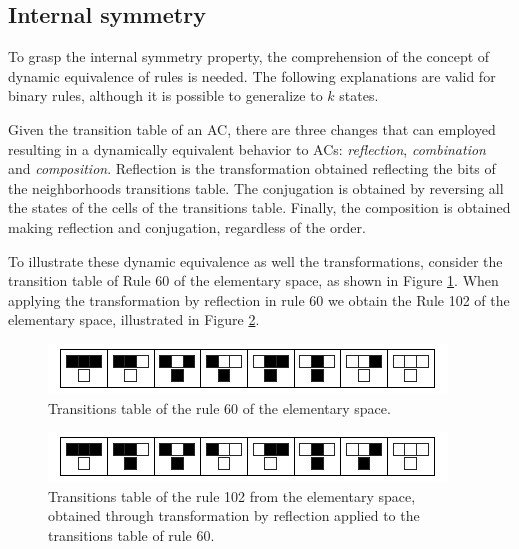 \documentclass{llncs}
\begin{document}
\subsection{Internal symmetry}
To grasp the internal symmetry property, the comprehension of the concept of dynamic equivalence of rules is needed. The following explanations are valid for binary rules, although it is possible to generalize to $k$ states.


Given the transition table of an AC, there are three changes that can employed resulting in a dynamically equivalent behavior to ACs: \textit{reflection}, \textit{combination} and \textit{composition}. Reflection is the transformation obtained reflecting the bits of the neighborhoods transitions table. The conjugation is obtained by reversing all the states of the cells of the transitions table. Finally, the composition is obtained making reflection and conjugation, regardless of the order.

To illustrate these dynamic equivalence as well the transformations, consider the transition table of Rule 60 of the elementary space, as shown in Figure \ref{fig:table60}. When applying the transformation by reflection in rule 60 we obtain the Rule 102 of the elementary space, illustrated in Figure \ref{fig:table102}.

  \begin{figure}[h!]
    \centering
    \includegraphics[width=.5\textwidth]{fig_ruleIcon60.png}
    \caption{Transitions table of the rule 60 of the elementary space.}
    \label{fig:table60}
  \end{figure}

  \begin{figure}[h!]
    \centering
    \includegraphics[width=.5\textwidth]{fig_ruleIcon102.png}
    \caption{Transitions table of the rule 102 from the elementary space, obtained through transformation by reflection applied to the transitions table of rule 60.}
    \label{fig:table102}
  \end{figure}

\end{document}
